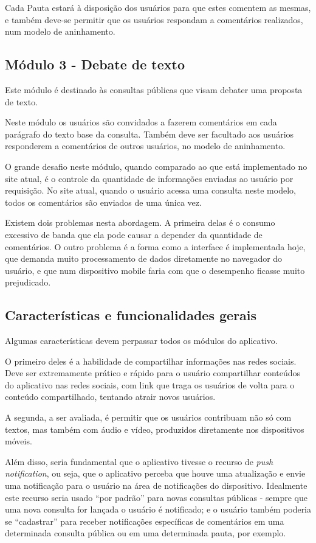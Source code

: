 Cada Pauta estará à disposição dos usuários para que estes comentem as mesmas, e também deve-se permitir que os usuários respondam a comentários realizados, num modelo de aninhamento.

\subsection{Módulo 3 - Debate de texto}
Este módulo é destinado às consultas públicas que visam debater uma proposta de texto.

Neste módulo os usuários são convidados a fazerem comentários em cada parágrafo do texto base da consulta. Também deve ser facultado aos usuários responderem a comentários de outros usuários, no modelo de aninhamento.

O grande desafio neste módulo, quando comparado ao que está implementado no site atual, é o controle da quantidade de informações enviadas ao usuário por requisição. No site atual, quando o usuário acessa uma consulta neste modelo, todos os comentários são enviados de uma única vez.

Existem dois problemas nesta abordagem. A primeira delas é o consumo excessivo de banda que ela pode causar a depender da quantidade de comentários. O outro problema é a forma como a interface é implementada hoje, que demanda muito processamento de dados diretamente no navegador do usuário, e que num dispositivo mobile faria com que o desempenho ficasse muito prejudicado.

\subsection{Características e funcionalidades gerais}
Algumas características devem perpassar todos os módulos do aplicativo.

O primeiro deles é a habilidade de compartilhar informações nas redes sociais. Deve ser extremamente prático e rápido para o usuário compartilhar conteúdos do aplicativo nas redes sociais, com link que traga os usuários de volta para o conteúdo compartilhado, tentando atrair novos usuários.

A segunda, a ser avaliada, é permitir que os usuários contribuam não só com textos, mas também com áudio e vídeo, produzidos diretamente nos dispositivos móveis.

Além disso, seria fundamental que o aplicativo tivesse o recurso de \textit{push notification}, ou seja, que o aplicativo perceba que houve uma atualização e envie uma notificação para o usuário na área de notificações do dispositivo. Idealmente este recurso seria usado ``por padrão'' para novas consultas públicas - sempre que uma nova consulta for lançada o usuário é notificado; e o usuário também poderia se ``cadastrar'' para receber notificações específicas de comentários em uma determinada consulta pública ou em uma determinada pauta, por exemplo.

